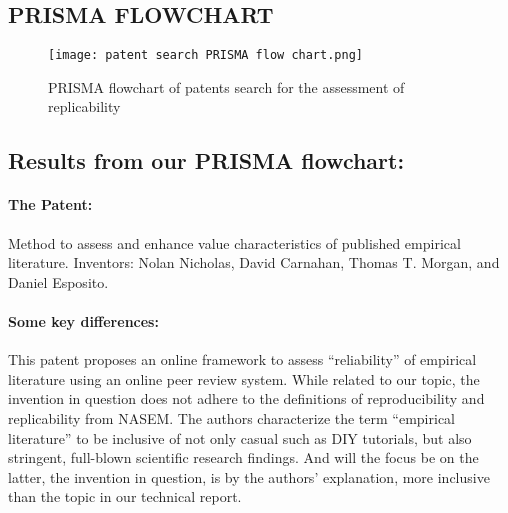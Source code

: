 \documentclass[
10pt, %
a4paper, %
oneside, %
headinclude,footinclude, %
BCOR5mm, %
]{scrartcl}
\begin{document}
\subsection{PRISMA FLOWCHART}
\begin{figure}[h]
  \centering
  \texttt{[image: patent search PRISMA flow chart.png]}
  \caption{PRISMA flowchart of patents search for the assessment of replicability}
  \label{fig:chart}
\end{figure}
\newpage

\subsection{Results from our PRISMA flowchart:}

\paragraph{The Patent:}
Method to assess and enhance value characteristics of published empirical literature.
\newline
Inventors: Nolan Nicholas, David Carnahan, Thomas T. Morgan, and Daniel Esposito.

\paragraph{Some key differences:}
This patent proposes an online framework to assess “reliability” of empirical literature using an online peer review system. While related to our topic, the invention in question does not adhere to the definitions of reproducibility and replicability from NASEM.
The authors characterize the term “empirical literature” to be inclusive of not only casual such as DIY tutorials, but also stringent, full-blown scientific research findings. And will the focus be on the latter, the invention in question, is by the authors’ explanation, more inclusive than the topic in our technical report.  
\end{document}

